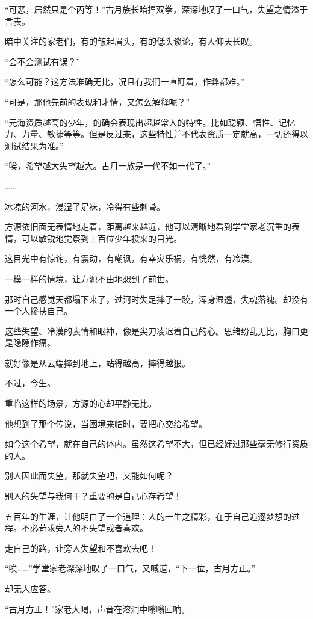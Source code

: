 \begin{this_body}
“可恶，居然只是个丙等！”古月族长暗捏双拳，深深地叹了一口气，失望之情溢于言表。

暗中关注的家老们，有的皱起眉头，有的低头谈论，有人仰天长叹。

“会不会测试有误？”

“怎么可能？这方法准确无比，况且有我们一直盯着，作弊都难。”

“可是，那他先前的表现和才情，又怎么解释呢？”

“元海资质越高的少年，的确会表现出超越常人的特性。比如聪颖、悟性、记忆力、力量、敏捷等等。但是反过来，这些特性并不代表资质一定就高，一切还得以测试结果为准。”

“唉，希望越大失望越大。古月一族是一代不如一代了。”

……

冰凉的河水，浸湿了足袜，冷得有些刺骨。

方源依旧面无表情地走着，距离越来越近，他可以清晰地看到学堂家老沉重的表情，可以敏锐地觉察到上百位少年投来的目光。

这目光中有惊诧，有震动，有嘲讽，有幸灾乐祸，有恍然，有冷漠。

一模一样的情境，让方源不由地想到了前世。

那时自己感觉天都塌下来了，过河时失足摔了一跤，浑身湿透，失魂落魄。却没有一个人搀扶自己。

这些失望、冷漠的表情和眼神，像是尖刀凌迟着自己的心。思绪纷乱无比，胸口更是隐隐作痛。

就好像是从云端摔到地上，站得越高，摔得越狠。

不过，今生。

重临这样的场景，方源的心却平静无比。

他想到了那个传说，当困境来临时，要把心交给希望。

如今这个希望，就在自己的体内。虽然这希望不大，但已经好过那些毫无修行资质的人。

别人因此而失望，那就失望吧，又能如何呢？

别人的失望与我何干？重要的是自己心存希望！

五百年的生涯，让他明白了一个道理：人的一生之精彩，在于自己追逐梦想的过程。不必苛求旁人的不失望或者喜欢。

走自己的路，让旁人失望和不喜欢去吧！

“唉……”学堂家老深深地叹了一口气，又喊道，“下一位，古月方正。”

却无人应答。

“古月方正！”家老大喝，声音在溶洞中嗡嗡回响。


\end{this_body}
